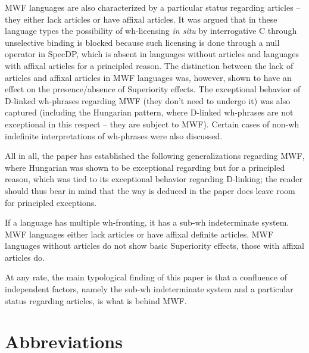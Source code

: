 \documentclass[output=paper,colorlinks,citecolor=brown]{langscibook}
\begin{document}
MWF languages are also characterized by a particular status regarding articles -- they either lack articles or have affixal articles. It was argued that in these language types the possibility of wh-licensing \textit{in situ} by interrogative C through unselective binding is blocked because such licensing is done through a null operator in SpecDP, which is absent in languages without articles and languages with affixal articles for a principled reason. The distinction between the lack of articles and affixal articles in MWF languages was, however, shown to have an effect on the presence/absence of Superiority effects. The exceptional behavior of D-linked wh-phrases regarding MWF (they don't need to undergo it) was also captured (including the Hungarian pattern, where D-linked wh-phrases are not exceptional in this respect -- they are subject to MWF). Certain cases of non-wh indefinite interpretations of wh-phrases were also discussed.

All in all, the paper has established the following generalizations regarding MWF, where Hungarian was shown to be exceptional regarding  but for a principled reason, which was tied to its exceptional behavior regarding D-linking; the reader should thus bear in mind that the way  is deduced in the paper does leave room for principled exceptions.

 
\ea\label{ex:bosk:35}
\ea \label{ex:bosk:35a}
If a language has multiple wh-fronting, it has a sub-wh indeterminate system.
\ex \label{ex:bosk:35b}
MWF languages either lack articles or have affixal definite articles.
\ex \label{ex:bosk:35c}
MWF languages without articles do not show basic Superiority effects, those with affixal articles do.
\z 
\z 

\noindent At any rate, the main typological finding of this paper is that a confluence of independent factors, namely the sub-wh indeterminate system and a particular status regarding articles, is what is behind MWF.

\section*{Abbreviations}
\end{document}
